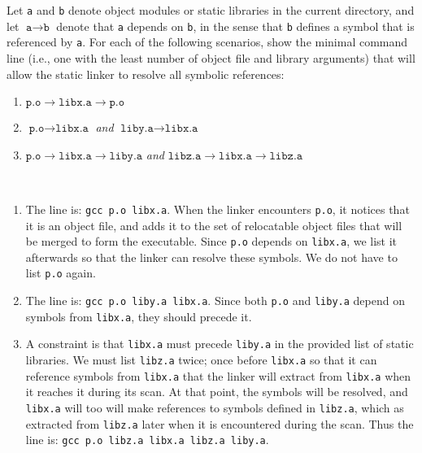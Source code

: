 \documentclass[12pt]{article}
\newenvironment{ex}[2][Exercise]{\begin{trivlist}
		\item[\hskip \labelsep {\bfseries #1}\hskip \labelsep {\bfseries #2.}]}{\end{trivlist}}
\newenvironment{sol}[1][Solution]{\begin{trivlist}
		\item[\hskip \labelsep {\bfseries #1:}]}{\end{trivlist}}
\begin{document}
\begin{ex}{7.10}
	Let \texttt{a} and \texttt{b} denote object modules or static libraries in the current directory, and
	let $\texttt{a}\to\texttt{b}$ denote that \texttt{a} depends on \texttt{b}, in the sense that
	\texttt{b} defines a symbol that is referenced by \texttt{a}. For each of the following scenarios, show
	the minimal command line (i.e., one with the least number of object file and library arguments)
	that will allow the static linker to resolve all symbolic references:
	\begin{enumerate}[label=(\alph*)]
		\item $\texttt{p.o} \to \texttt{libx.a} \to \texttt{p.o}$
		\item $\texttt{p.o}\to \texttt{libx.a}$ \emph{and} $\texttt{liby.a}\to \texttt{libx.a}$
		\item $\texttt{p.o}\to\texttt{libx.a}\to\texttt{liby.a}$ \emph{and}
		$\texttt{libz.a}\to\texttt{libx.a}\to\texttt{libz.a}$
	\end{enumerate}
\end{ex}

\begin{sol}
	\
	\begin{enumerate}[label=(\alph*)]
		\item The line is: \texttt{gcc p.o libx.a}. When the linker encounters \texttt{p.o}, it
		notices that it is an object file, and adds it to the set of relocatable object files that
		will be merged to form the executable. Since \texttt{p.o} depends on \texttt{libx.a},
		we list it afterwards so that the linker can resolve these symbols. We do not have to
		list \texttt{p.o} again.
		\item The line is: \texttt{gcc p.o liby.a libx.a}. Since both \texttt{p.o} and \texttt{liby.a}
		depend on symbols from \texttt{libx.a}, they should precede it.
		\item A constraint is that \texttt{libx.a} must precede \texttt{liby.a} in the provided list
		of static libraries. We must list \texttt{libz.a} twice; once before \texttt{libx.a} so
		that it can reference symbols from \texttt{libx.a} that the linker will extract from
		\texttt{libx.a} when it reaches it during its scan. At that point, the symbols will be resolved,
		and \texttt{libx.a} will too will make references to symbols defined in \texttt{libz.a},
		which as extracted from \texttt{libz.a} later when it is encountered during the scan.
		Thus the line is: \texttt{gcc p.o libz.a libx.a libz.a liby.a}.
	\end{enumerate}
\end{sol}
\end{document}
